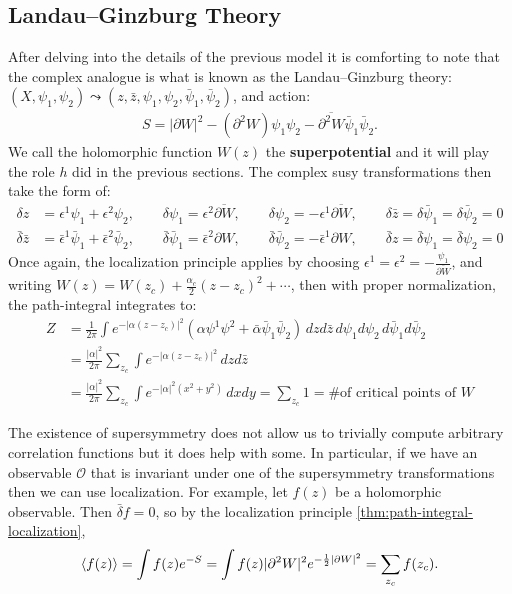 \documentclass{report}
\theoremstyle{plain}
\theoremstyle{definition}
\theoremstyle{remark}
\newcommand{\di}{\partial}
\newcommand{\mc}{\mathcal}
\newcommand{\FR}[2]{\frac{#1}{#2}}
\begin{document}
\subsection{Landau--Ginzburg Theory}
After delving into the details of the previous model it is comforting to
note that the complex analogue is what is known as the Landau--Ginzburg
theory: $(X,\psi_1,\psi_2) \leadsto (z,\bar z, \psi_1, \psi_2, \bar\psi_1,
\bar\psi_2)$, and action:
\begin{align}
S = |\di W|^2-(\di^2 W)\psi_1\psi_2 - \overline{\di^2W}\bar\psi_1\bar\psi_2.
\label{LandauGinzburgaction}
\end{align}
We call the holomorphic function $W(z)$ the \textbf{superpotential}
and it will play the role $h$ did in the previous sections. The
complex susy transformations then take the form of:
\begin{align}
\delta z &= \epsilon^1\psi_1+\epsilon^2\psi_2, \qquad
\delta\psi_1 = \epsilon^2\overline{\di W},\qquad
\delta\psi_2 =-\epsilon^1\overline{\di W},\qquad
\delta \bar z=\delta\bar\psi_1 = \delta\bar\psi_2=0\\
\bar\delta\bar z &= \bar\epsilon^1\bar\psi_1+\bar\epsilon^2\bar\psi_2, \qquad
\bar\delta\bar \psi_1 = \bar\epsilon^2\di W,\qquad
\bar\delta\bar \psi_2 =-\bar\epsilon^1\di W,\qquad
\bar\delta z=\bar\delta\psi_1 = \bar\delta\psi_2=0
\label{complexsusytransformations}
\end{align}
Once again, the localization principle applies by choosing
$\epsilon^1=\epsilon^2=-\FR{\psi_1}{\overline{\di W}}$, and writing $W(z) =
W(z_c)+\FR{\alpha_c}{2}(z-z_c)^2+\cdots$, then with proper normalization,
the path-integral integrates to:
\begin{align*}
    Z &= \FR{1}{2\pi}\int
    e^{-|\alpha(z-z_c)|^2}(\alpha\psi^1\psi^2+\bar\alpha\bar\psi_1\bar\psi_2)\,
    dzd\bar z\,d\psi_1d\psi_2\,d\bar\psi_1d\bar\psi_2\\
&= \FR{|\alpha|^2}{2\pi} \sum_{z_c} \int e^{-|\alpha(z-z_c)|^2}\,dzd\bar z\\
&= \FR{|\alpha|^2}{2\pi} \sum_{z_c} \int e^{-|\alpha|^2(x^2+y^2)} \,dxdy
= \sum_{z_c} 1 = \text{\# of critical points of $W$}
\end{align*}

The existence of supersymmetry does not allow us to trivially compute
arbitrary correlation functions but it does help with some. In
particular, if we have an observable $\mc O$ that is invariant under
one of the supersymmetry transformations then we can use localization.
For example, let $f(z)$ be a holomorphic observable. Then
$\bar{\delta} f = 0$, so by the localization principle
\ref{thm:path-integral-localization},
\[ \braket{f(z)} = \int f(z) e^{-S} = \int f(z)|\di^2 W|^2 e^{-\FR{1}{2}|\di W|^2} = \sum_{z_c} f(z_c). \]
\end{document}

